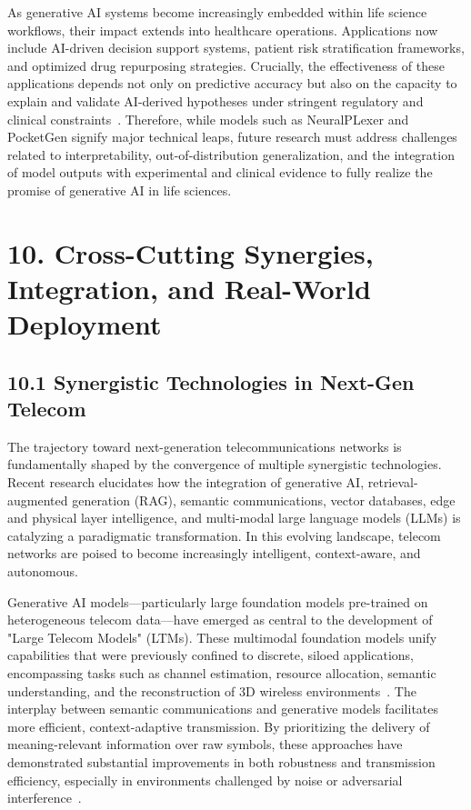 \documentclass[11pt]{article}
\begin{document}
As generative AI systems become increasingly embedded within life science workflows, their impact extends into healthcare operations. Applications now include AI-driven decision support systems, patient risk stratification frameworks, and optimized drug repurposing strategies. Crucially, the effectiveness of these applications depends not only on predictive accuracy but also on the capacity to explain and validate AI-derived hypotheses under stringent regulatory and clinical constraints~\cite{ref26}. Therefore, while models such as NeuralPLexer and PocketGen signify major technical leaps, future research must address challenges related to interpretability, out-of-distribution generalization, and the integration of model outputs with experimental and clinical evidence to fully realize the promise of generative AI in life sciences.

\section{10. Cross-Cutting Synergies, Integration, and Real-World Deployment}

\subsection{10.1 Synergistic Technologies in Next-Gen Telecom}

The trajectory toward next-generation telecommunications networks is fundamentally shaped by the convergence of multiple synergistic technologies. Recent research elucidates how the integration of generative AI, retrieval-augmented generation (RAG), semantic communications, vector databases, edge and physical layer intelligence, and multi-modal large language models (LLMs) is catalyzing a paradigmatic transformation. In this evolving landscape, telecom networks are poised to become increasingly intelligent, context-aware, and autonomous.

Generative AI models—particularly large foundation models pre-trained on heterogeneous telecom data—have emerged as central to the development of "Large Telecom Models" (LTMs). These multimodal foundation models unify capabilities that were previously confined to discrete, siloed applications, encompassing tasks such as channel estimation, resource allocation, semantic understanding, and the reconstruction of 3D wireless environments~\cite{ref24}. The interplay between semantic communications and generative models facilitates more efficient, context-adaptive transmission. By prioritizing the delivery of meaning-relevant information over raw symbols, these approaches have demonstrated substantial improvements in both robustness and transmission efficiency, especially in environments challenged by noise or adversarial interference~\cite{ref20,ref26}.
\end{document}
